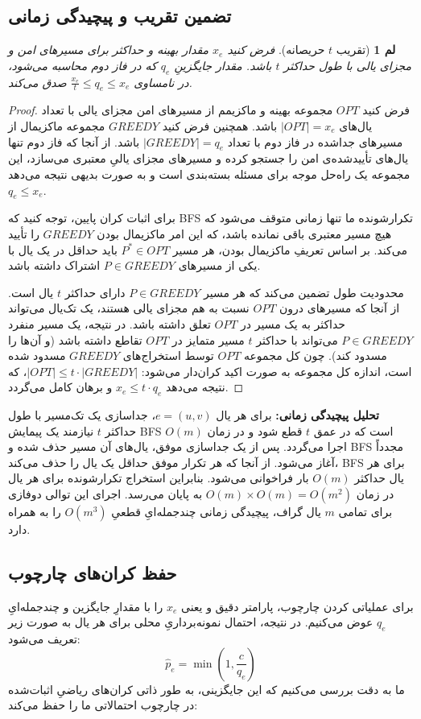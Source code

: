 \documentclass[11pt,a4paper]{report}
\theoremstyle{plain}
\newtheorem{lem}[thm]{\normalsize لم}
\theoremstyle{definition}
\theoremstyle{remark}
\begin{document}
\subsection{تضمین تقریب و پیچیدگی زمانی}
\begin{lem}[تقریب $t$ حریصانه]\label{lem:greedy_approx}
فرض کنید $x_e$ مقدار بهینه و حداکثر برای مسیرهای امن و مجزای یالی با طول حداکثر $t$ باشد. مقدار جایگزینِ $q_e$ که در فاز دوم محاسبه می‌شود، در نامساوی $\frac{x_e}{t} \le q_e \le x_e$ صدق می‌کند.
\end{lem}
\begin{proof}
فرض کنید $OPT$ مجموعه بهینه و ماکزیمم از مسیرهای امن مجزای یالی با تعداد یال‌های $|OPT| = x_e$ باشد. همچنین فرض کنید $GREEDY$ مجموعه ماکزیمال از مسیرهای جداشده در فاز دوم با تعداد $|GREEDY| = q_e$ باشد. از آنجا که فاز دوم تنها یال‌های تأییدشده‌ی امن را جستجو کرده و مسیرهای مجزای یالیِ معتبری می‌سازد، این مجموعه یک راه‌حل موجه برای مسئله بسته‌بندی است و به صورت بدیهی نتیجه می‌دهد $q_e \le x_e$.

برای اثبات کران پایین، توجه کنید که BFS تکرارشونده ما تنها زمانی متوقف می‌شود که هیچ مسیر معتبری باقی نمانده باشد، که این امر ماکزیمال بودن $GREEDY$ را تأیید می‌کند. بر اساس تعریفِ ماکزیمال بودن، هر مسیر $P^* \in OPT$ باید حداقل در یک یال با یکی از مسیرهای $P \in GREEDY$ اشتراک داشته باشد. 

محدودیت طول تضمین می‌کند که هر مسیر $P \in GREEDY$ دارای حداکثر $t$ یال است. از آنجا که مسیرهای درون $OPT$ نسبت به هم مجزای یالی هستند، یک تک‌یال می‌تواند حداکثر به یک مسیر در $OPT$ تعلق داشته باشد. در نتیجه، یک مسیر منفرد $P \in GREEDY$ می‌تواند با حداکثر $t$ مسیر متمایز در $OPT$ تقاطع داشته باشد (و آن‌ها را مسدود کند). چون کل مجموعه $OPT$ توسط استخراج‌های $GREEDY$ مسدود شده است، اندازه کل مجموعه به صورت اکید کران‌دار می‌شود: $|OPT| \le t \cdot |GREEDY|$، که نتیجه می‌دهد $x_e \le t \cdot q_e$ و برهان کامل می‌گردد.
\end{proof}

\textbf{تحلیل پیچیدگی زمانی:} 
برای هر یال $e=(u,v)$، جداسازی یک تک‌مسیر با طول حداکثر $t$ نیازمند یک پیمایش BFS است که در عمق $t$ قطع شود و در زمان $O(m)$ اجرا می‌گردد. پس از یک جداسازی موفق، یال‌های آن مسیر حذف شده و BFS مجدداً آغاز می‌شود. از آنجا که هر تکرار موفق حداقل یک یال را حذف می‌کند، BFS برای هر یال حداکثر $O(m)$ بار فراخوانی می‌شود. بنابراین استخراج تکرارشونده برای هر یال در زمان $O(m) \times O(m) = O(m^2)$ به پایان می‌رسد. اجرای این توالی دوفازی برای تمامی $m$ یال گراف، پیچیدگی زمانی چندجمله‌ایِ قطعیِ $O(m^3)$ را به همراه دارد.

\subsection{حفظ کران‌های چارچوب}
برای عملیاتی کردن چارچوب، پارامتر دقیق و  یعنی $x_e$ را با مقدارِ جایگزین و چندجمله‌ایِ $q_e$ عوض می‌کنیم. در نتیجه، احتمال نمونه‌برداریِ محلی برای هر یال به صورت زیر تعریف می‌شود:
\[
\hat{p}_e = \min\left(1, \frac{c}{q_e}\right)
\]
ما به دقت بررسی می‌کنیم که این جایگزینی، به طور ذاتی کران‌های ریاضیِ اثبات‌شده در چارچوب احتمالاتی ما را حفظ می‌کند:
\end{document}
